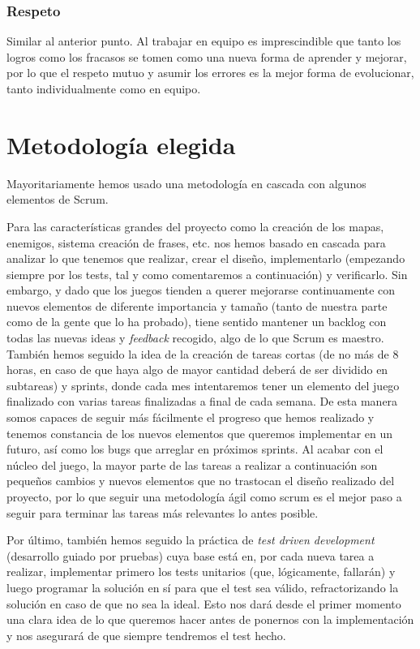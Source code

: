 \subsubsection{Respeto}

Similar al anterior punto. Al trabajar en equipo es imprescindible que tanto los logros como los fracasos se tomen como una nueva forma de aprender y mejorar, por lo que el respeto mutuo y asumir los errores es la mejor forma de evolucionar, tanto individualmente como en equipo.

\section{Metodología elegida}

Mayoritariamente hemos usado una metodología en cascada con algunos elementos de Scrum.

Para las características grandes del proyecto como la creación de los mapas, enemigos, sistema creación de frases, etc. nos hemos basado en cascada para analizar lo que tenemos que realizar, crear el diseño, implementarlo (empezando siempre por los tests, tal y como comentaremos a continuación) y verificarlo. Sin embargo, y dado que los juegos tienden a querer mejorarse continuamente con nuevos elementos de diferente importancia y tamaño (tanto de nuestra parte como de la gente que lo ha probado), tiene sentido mantener un backlog con todas las nuevas ideas y \textit{feedback} recogido, algo de lo que Scrum es maestro. También hemos seguido la idea de la creación de tareas cortas (de no más de 8 horas, en caso de que haya algo de mayor cantidad deberá de ser dividido en subtareas) y sprints, donde cada mes intentaremos tener un elemento del juego finalizado con varias tareas finalizadas a final de cada semana. De esta manera somos capaces de seguir más fácilmente el progreso que hemos realizado y tenemos constancia de los nuevos elementos que queremos implementar en un futuro, así como los bugs que arreglar en próximos sprints.
Al acabar con el núcleo del juego, la mayor parte de las tareas a realizar a continuación son pequeños cambios y nuevos elementos que no trastocan el diseño realizado del proyecto, por lo que seguir una metodología ágil como scrum es el mejor paso a seguir para terminar las tareas más relevantes lo antes posible.

Por último, también hemos seguido la práctica de \textit{test driven development} (desarrollo guiado por pruebas) cuya base está en, por cada nueva tarea a realizar, implementar primero los tests unitarios (que, lógicamente, fallarán) y luego programar la solución en sí para que el test sea válido, refractorizando la solución en caso de que no sea la ideal. Esto nos dará desde el primer momento una clara idea de lo que queremos hacer antes de ponernos con la implementación y nos asegurará de que siempre tendremos el test hecho.